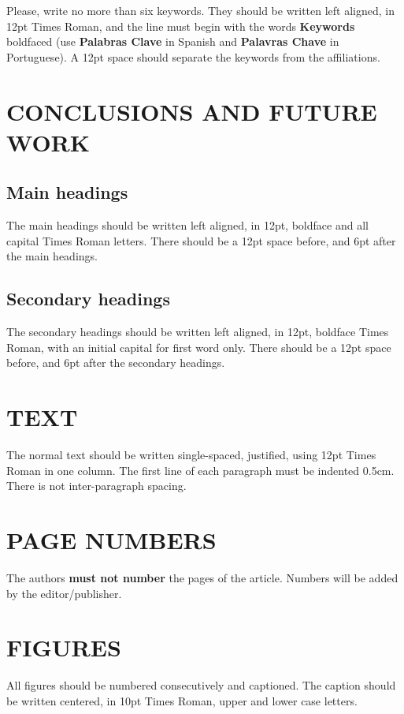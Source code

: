 \documentclass[oneside,a4paper,english,links]{amca}
\begin{document}
Please, write no more than six keywords.  They should be written left
aligned, in 12pt Times Roman, and the line must begin with the words
{\bf Keywords} boldfaced (use {\bf Palabras Clave} in Spanish and {\bf
Palavras Chave} in Portuguese). A 12pt space should separate the
keywords from the affiliations.

\section{CONCLUSIONS AND FUTURE WORK}

\subsection{Main headings}

The main headings should be written left aligned, in 12pt, boldface
and all capital Times Roman letters. There should be a 12pt space
before, and 6pt after the main headings.

\subsection{Secondary headings}

The secondary headings should be written left aligned, in 12pt,
boldface Times Roman, with an initial capital for first word only. There
should be a 12pt space before, and 6pt after the secondary headings.

\section{TEXT}

The normal text should be written single-spaced, justified, using 12pt
Times Roman in one column. The first line of each paragraph must be
indented 0.5cm. There is not inter-paragraph spacing.

\section{PAGE NUMBERS}

The authors {\bf must not number} the pages of the article. Numbers will
be added by the editor/publisher. 

\section{FIGURES}

All figures should be numbered consecutively and captioned. The
caption should be written centered, in 10pt Times Roman, upper and lower
case letters.
\end{document}
